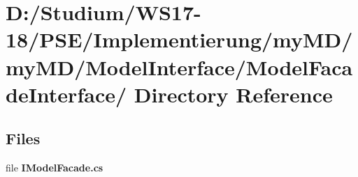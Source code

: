\hypertarget{dir_D_3A_2FStudium_2FWS17_2D18_2FPSE_2FImplementierung_2FmyMD_2FmyMD_2FModelInterface_2FModelFacadeInterface_2F}{
\section{D:/Studium/WS17-18/PSE/Implementierung/my\-MD/my\-MD/Model\-Interface/Model\-Facade\-Interface/ Directory Reference}
\label{dir_D_3A_2FStudium_2FWS17_2D18_2FPSE_2FImplementierung_2FmyMD_2FmyMD_2FModelInterface_2FModelFacadeInterface_2F}
}


\subsection*{Files}
\begin{CompactItemize}
\item 
file {\bf IModel\-Facade.cs}
\end{CompactItemize}
